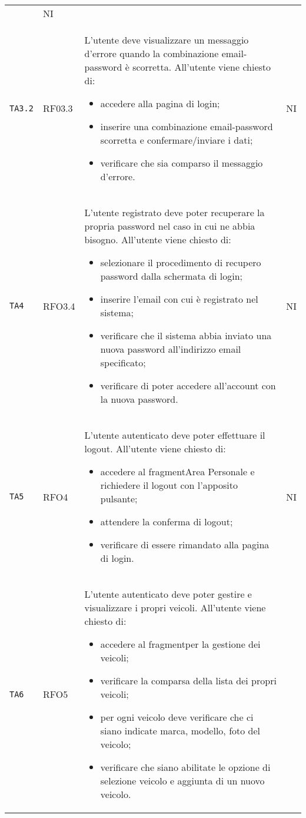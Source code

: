 \begin{longtable}{ >{\centering}p{} >{\centering}p{} >{\centering}p{}
			>{\centering}p{}}
\begin{itemize}
		 \end{itemize}  &	NI	\tabularnewline
		 \texttt{TA3.2} & RF03.3 &	L'utente deve visualizzare un messaggio d'errore quando la combinazione email-password è scorretta. All'utente viene chiesto di:
		 \begin{itemize}
		 	\item accedere alla pagina di login;
		 	\item inserire una combinazione email-password scorretta e confermare/inviare i dati;
		 	\item verificare che sia comparso il messaggio d'errore.
		 \end{itemize}  &	NI	\tabularnewline
		 \texttt{TA4} & RFO3.4	&	L'utente registrato deve poter recuperare la propria password nel caso in cui ne abbia bisogno. All'utente viene chiesto di:
		 \begin{itemize}
		 	\item selezionare il procedimento di recupero password dalla schermata di login;
		 	\item inserire l'email con cui è registrato nel sistema;
		 	\item verificare che il sistema abbia inviato una nuova password all'indirizzo email specificato;
		 	\item verificare di poter accedere all'account con la nuova password.
		 \end{itemize}	&	NI	\tabularnewline
		 \texttt{TA5}	& RFO4 &	L'utente autenticato deve poter effettuare il logout. All'utente viene chiesto di:
		 \begin{itemize}
		 	\item accedere al fragment\glosp Area Personale e richiedere il logout con l'apposito pulsante;
		 	\item attendere la conferma di logout;
		 	\item verificare di essere rimandato alla pagina di login.
		 \end{itemize}  &	NI	\tabularnewline
		 \texttt{TA6}	& RFO5 & L'utente autenticato deve poter gestire e visualizzare i propri veicoli. 
		 All'utente viene chiesto di:
		 \begin{itemize}
		 	\item accedere al fragment\glosp per la gestione dei veicoli;
		 	\item verificare la comparsa della lista dei propri veicoli;
		 	\item per ogni veicolo deve verificare che ci siano indicate marca, modello, foto del veicolo;
		 	\item verificare che siano abilitate le opzione di selezione veicolo e aggiunta di un nuovo veicolo. 

\end{itemize}
\end{longtable}
